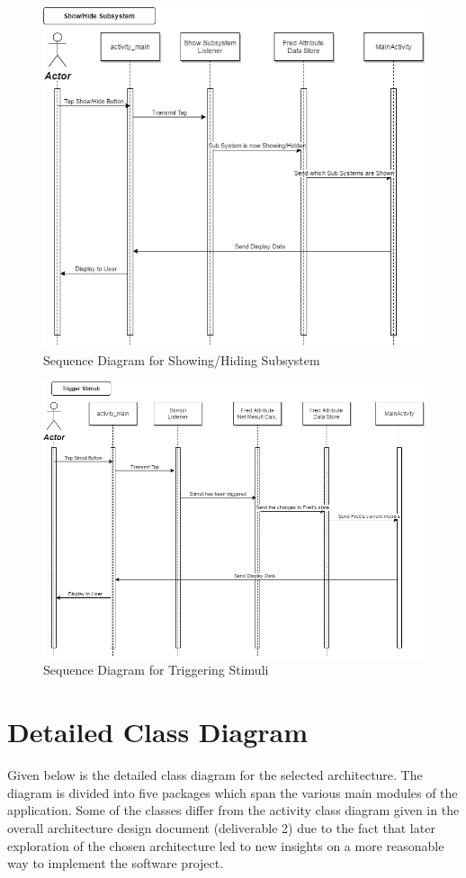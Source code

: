 \documentclass[]{article}
\begin{document}
\begin{figure}[H]
	\centering
	\includegraphics[width=0.7\linewidth]{../Resources/Show_Subsystem_Sequence_Diagram.png}
	\caption{Sequence Diagram for Showing/Hiding Subsystem}
\end{figure}
\begin{figure}[H]
	\centering
	\includegraphics[width=0.7\linewidth]{../Resources/Trigger_Stimuli_Sequence_Diagram.png}
	\caption{Sequence Diagram for Triggering Stimuli}
\end{figure}

\section{Detailed Class Diagram}
\label{sec:detailed_class_diagram}
Given below is the detailed class diagram for the selected architecture. The diagram is divided into five packages which span the various main modules of the application.
Some of the classes differ from the activity class diagram given in the overall architecture design document (deliverable 2) due to the fact that later exploration of the chosen
architecture led to new insights on a more reasonable way to implement the software project.
\end{document}
